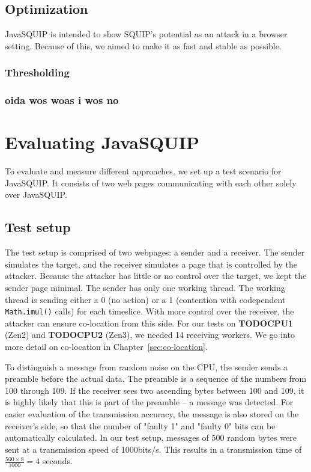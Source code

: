 \documentclass[11pt,
  titlepage=false,
]{scrreprt}
\begin{document}
\section{Optimization}
JavaSQUIP is intended to show SQUIP's potential as an attack in a browser setting.
Because of this, we aimed to make it as fast and stable as possible.

\subsection{Thresholding}

\subsection{oida wos woas i wos no}

\chapter{Evaluating JavaSQUIP}
\label{ch:evaluation}

To evaluate and measure different approaches, we set up a test scenario for JavaSQUIP.
It consists of two web pages communicating with each other solely over JavaSQUIP.

\section {Test setup}
\label{sec:testsetup}
The test setup is comprised of two webpages: a sender and a receiver.
The sender simulates the target, and the receiver simulates a page that is controlled by the attacker.
Because the attacker has little or no control over the target, we kept the sender page minimal.
The sender has only one working thread.
The working thread is sending either a 0 (no action) or a 1 (contention with codependent \texttt{Math.imul()} calls) for each timeslice.
With more control over the receiver, the attacker can ensure co-location from this side.
For our tests on \textbf{TODOCPU1} (Zen2) and \textbf{TODOCPU2} (Zen3), we needed 14 receiving workers.
We go into more detail on co-location in Chapter~\ref{sec:co-location}.

To distinguish a message from random noise on the CPU, the sender sends a preamble before the actual data.
The preamble is a sequence of the numbers from 100 through 109.
If the receiver sees two ascending bytes between 100 and 109, it is highly likely that this is part of the preamble --
a message was detected.
For easier evaluation of the transmission accuracy, the message is also stored on the receiver's side,
so that the number of "faulty 1" and "faulty 0" bits can be automatically calculated.
In our test setup, messages of 500 random bytes were sent at a transmission speed of 1000bits/s.
This results in a transmission time of $\frac{500 \times 8}{1000} = 4$ seconds.
\end{document}
